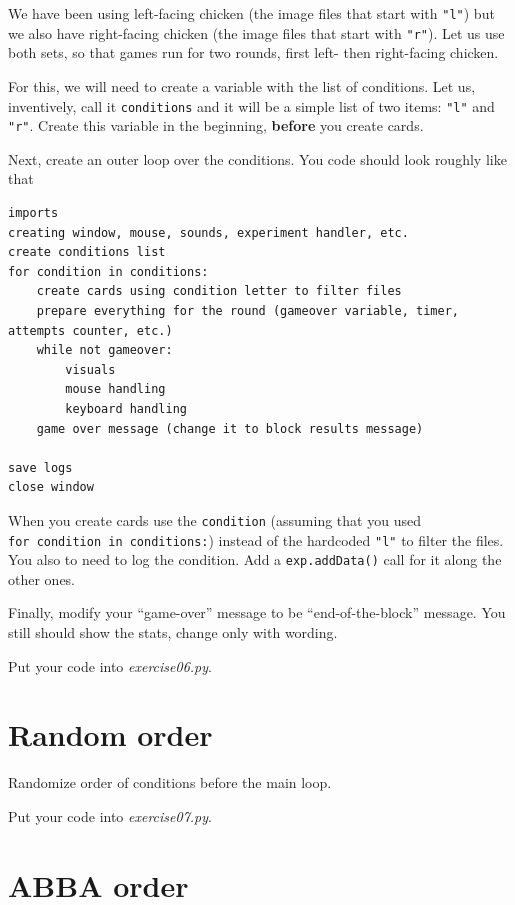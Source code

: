 \documentclass[
]{book}
\begin{document}
We have been using left-facing chicken (the image files that start with \texttt{"l"}) but we also have right-facing chicken (the image files that start with \texttt{"r"}). Let us use both sets, so that games run for two rounds, first left- then right-facing chicken.

For this, we will need to create a variable with the list of conditions. Let us, inventively, call it \texttt{conditions} and it will be a simple list of two items: \texttt{"\textquotesingle{}l\textquotesingle{}"} and \texttt{"r"}. Create this variable in the beginning, \textbf{before} you create cards.

Next, create an outer loop over the conditions. You code should look roughly like that

\begin{verbatim}
imports
creating window, mouse, sounds, experiment handler, etc.
create conditions list
for condition in conditions:
    create cards using condition letter to filter files
    prepare everything for the round (gameover variable, timer, attempts counter, etc.)
    while not gameover:
        visuals
        mouse handling
        keyboard handling
    game over message (change it to block results message)
        
save logs
close window
\end{verbatim}

When you create cards use the \texttt{condition} (assuming that you used \texttt{for\ condition\ in\ conditions:}) instead of the hardcoded \texttt{"l"} to filter the files. You also to need to log the condition. Add a \texttt{exp.addData()} call for it along the other ones.

Finally, modify your ``game-over'' message to be ``end-of-the-block'' message. You still should show the stats, change only with wording.

Put your code into \emph{exercise06.py}.

\hypertarget{random-order}{%
\section{Random order}\label{random-order}}

Randomize order of conditions before the main loop.

Put your code into \emph{exercise07.py}.

\hypertarget{abba-order}{%
\section{ABBA order}\label{abba-order}}
\end{document}
